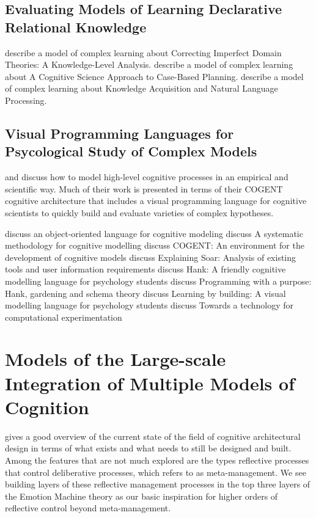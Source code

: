 \subsection{Evaluating Models of Learning Declarative Relational Knowledge}
\cite{huffman1993cidt} describe a model of complex learning about Correcting Imperfect Domain Theories: A Knowledge-Level Analysis.
\cite{hammond1993csacbp} describe a model of complex learning about A Cognitive Science Approach to Case-Based Planning.
\cite{wilensky1993kanlp} describe a model of complex learning about Knowledge Acquisition and Natural Language Processing.

\subsection{Visual Programming Languages for Psycological Study of Complex Models}

\cite{cooper2002mhl} and \cite{cooper1998cvd} discuss how to model high-level cognitive processes in an empirical and scientific way.
Much of their work is presented in terms of their COGENT cognitive architecture that includes a visual programming language for cognitive scientists to quickly build and evaluate varieties of complex hypotheses.

\cite{cooper1995too} discuss an object-oriented language for cognitive modeling
\cite{cooper1996smc} discuss A systematic methodology for cognitive modelling
\cite{cooper1998ced} discuss COGENT: An environment for the development of cognitive models
\cite{councill2003esa} discuss Explaining Soar: Analysis of existing tools and user information requirements
\cite{mulholland1998hfc} discuss Hank: A friendly cognitive modelling language for psychology students
\cite{mulholland1999pph} discuss Programming with a purpose: Hank, gardening and schema theory
\cite{mulholland2000lbv} discuss Learning by building: A visual modelling language for psychology students
\cite{yule2001ttc} discuss Towards a technology for computational experimentation

\section{Models of the Large-scale Integration of Multiple Models of Cognition}

\cite{langley2008car} gives a good overview of the current state of the field of cognitive architectural design in terms of what exists and what needs to still be designed and built.
Among the features that are not much explored are the types reflective processes that control deliberative processes, which \cite{sloman2001vaa} refers to as meta-management.
We see building layers of these reflective management processes in the top three layers of the Emotion Machine theory as our basic inspiration for higher orders of reflective control beyond meta-management.

